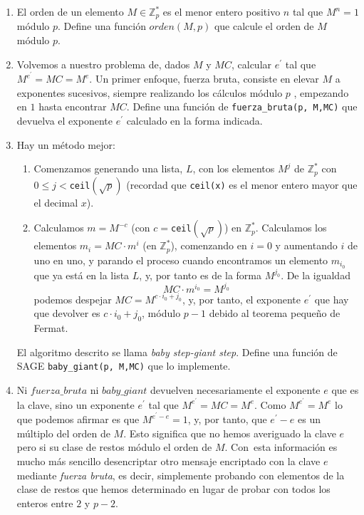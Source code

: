 \begin{ejer}
 \begin{enumerate}
  \item  El orden de un elemento $M \in \mathbb{Z}_{p}^{*}$   es el menor entero
positivo $n$ tal que $M^n=1$ m\'odulo $p$.    Define una función $orden(M,p)$
que calcule el orden de $M$ m\'odulo $p$.
  \item   Volvemos a nuestro problema de, dados $M$ y $MC$,  calcular $e^\prime$
tal que $M^{e^{\prime}}=MC=M^{e}$. Un primer enfoque, fuerza bruta,  consiste en
elevar $M$ a exponentes sucesivos,  siempre realizando los c\'alculos m\'odulo
$p$ , empezando en $1$ hasta encontrar $MC$. Define una funci\'on de {\sage} 
\lstinline|fuerza_bruta(p, M,MC)|  que devuelva el exponente $e^{\prime}$
calculado en la forma indicada.
 \item    Hay un m\'etodo mejor:
\begin{enumerate}
 \item    Comenzamos generando una lista, $L$, con los elementos $M^j$ de
$\mathbb{Z}_{p}^{*}$ con $0\le j<$\lstinline|ceil|$(\sqrt{p})$ 
(recordad que \lstinline$ceil(x)$ es el menor entero mayor que el decimal $x$).
 \item    Calculamos $m=M^{-c}$ (con $c=$\lstinline|ceil|$(\sqrt{p})$)  en 
$\mathbb{Z}_{p}^{*}$.
    Calculamos los elementos $m_i=MC\cdot m^{i }$ (en  $\mathbb{Z}_{p}^{*}$),
comenzando en $i=0$ y aumentando $i$ de uno en uno, y parando el proceso cuando
encontramos un elemento $m_{i_{0}}$ que ya está en la lista $L$, y, por tanto es
de la forma $M^{j_{0}}$. De la igualdad \[MC\cdot m^{i_0 }=M^{j_{0}}\] \noindent
podemos despejar $MC=M^{c\cdot i_0+j_0}$, y, por tanto, el exponente
$e^{\prime}$ que hay que devolver es $c\cdot i_0+j_0$, módulo $p-1$  debido al
teorema pequeño de Fermat.
\end{enumerate}

El algoritmo descrito se llama {\itshape baby step-giant step}. Define una
función de SAGE \lstinline|baby_giant(p, M,MC)| que lo implemente.

\item Ni $fuerza\_bruta$ ni $baby\_giant$ devuelven necesariamente el
exponente $e$ que es la clave, sino un exponente $e^{\prime}$ tal que
$M^{e^{\prime}}=MC=M^{e}$. Como $M^{e^{\prime}}=M^{e}$ lo que podemos afirmar es
que $M^{e^{\prime}-e}=1$, y, por tanto, que $e^{\prime}-e$ es un m\'ultiplo del
orden de $M$. Esto significa que no hemos averiguado la clave $e$ pero si su
clase de restos m\'odulo el orden de $M$. Con~esta informaci\'on es mucho m\'as
sencillo desencriptar otro mensaje encriptado con la clave $e$ mediante 
{\itshape fuerza
bruta}, es decir,  simplemente probando con elementos de la clase de restos que
hemos determinado en lugar de probar con todos los enteros entre $2$ y $p-2$.


\end{enumerate}
\end{ejer}
